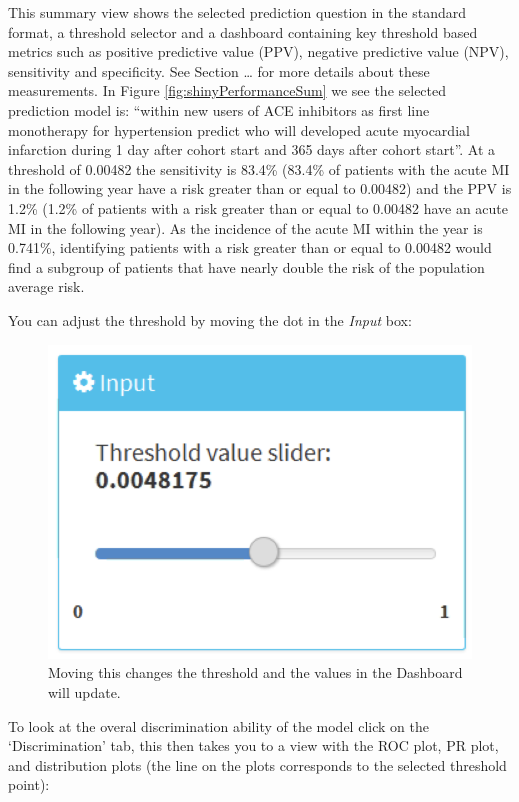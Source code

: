 \documentclass[11pt]{book}
\theoremstyle{definition}
\theoremstyle{definition}
\theoremstyle{definition}
\theoremstyle{remark}
\begin{document}
This summary view shows the selected prediction question in the standard format, a threshold selector and a dashboard containing key threshold based metrics such as positive predictive value (PPV), negative predictive value (NPV), sensitivity and specificity. See Section \ldots{} for more details about these measurements. In Figure \ref{fig:shinyPerformanceSum} we see the selected prediction model is: ``within new users of ACE inhibitors as first line monotherapy for hypertension predict who will developed acute myocardial infarction during 1 day after cohort start and 365 days after cohort start''. At a threshold of 0.00482 the sensitivity is 83.4\% (83.4\% of patients with the acute MI in the following year have a risk greater than or equal to 0.00482) and the PPV is 1.2\% (1.2\% of patients with a risk greater than or equal to 0.00482 have an acute MI in the following year). As the incidence of the acute MI within the year is 0.741\%, identifying patients with a risk greater than or equal to 0.00482 would find a subgroup of patients that have nearly double the risk of the population average risk.

You can adjust the threshold by moving the dot in the \emph{Input} box:

\begin{figure}

{\centering \includegraphics[width=0.8\linewidth]{images/PatientLevelPrediction/shiny/shinyPerformanceThres} 

}

\caption{Moving this changes the threshold and the values in the Dashboard will update.}\label{fig:shinyPerformanceThres}
\end{figure}

To look at the overal discrimination ability of the model click on the `Discrimination' tab, this then takes you to a view with the ROC plot, PR plot, and distribution plots (the line on the plots corresponds to the selected threshold point):
\end{document}

